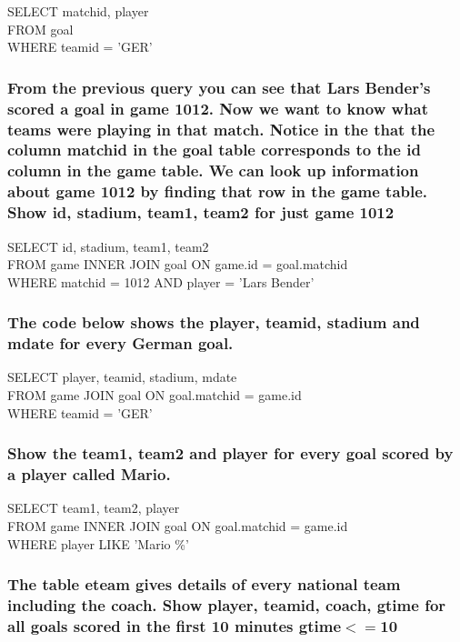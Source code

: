 \documentclass[10pt, oneside]{article}
\begin{document}
SELECT matchid, player \\
FROM goal\\
WHERE teamid = 'GER'\\

\subsubsection{From the previous query you can see that Lars Bender's scored a goal in game 1012. Now we want to know what teams were playing in that match. Notice in the that the column matchid in the goal table corresponds to the id column in the game table. We can look up information about game 1012 by finding that row in the game table. Show id, stadium, team1, team2 for just game 1012}

SELECT id, stadium, team1, team2\\
FROM game INNER JOIN goal ON game.id = goal.matchid\\
WHERE matchid = 1012 AND player = 'Lars Bender'\\

\subsubsection{The code below shows the player, teamid, stadium and mdate for every German goal.}

SELECT player, teamid, stadium, mdate\\
FROM game JOIN goal ON goal.matchid = game.id\\
WHERE teamid = 'GER'\\

\subsubsection{Show the team1, team2 and player for every goal scored by a player called Mario.}

SELECT team1, team2, player \\
FROM game INNER JOIN goal ON goal.matchid = game.id\\
WHERE player LIKE 'Mario \%'\\

\subsubsection{The table eteam gives details of every national team including the coach. Show player, teamid, coach, gtime for all goals scored in the first 10 minutes gtime$<=$10}
\end{document}
